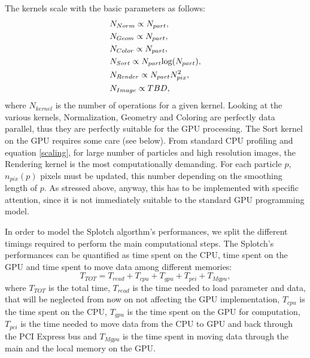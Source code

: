\documentclass[11pt]{article}
\begin{document}
The kernels scale with the basic parameters as follows:
\begin{align}\label{scaling}
& N_{Norm} \propto N_{part},\\
& N_{Geom} \propto N_{part},\\
& N_{Color} \propto N_{part},\\
& N_{Sort} \propto N_{part}{\rm log}(N_{part}),\\
& N_{Render} \propto N_{part}N_{pix}^2,\\
& N_{Image} \propto TBD,
\end{align}
where $N_{kernel}$ is the number of operations for a given kernel.
Looking at the various kernels, Normalization, Geometry and Coloring are perfectly 
data parallel, thus they are perfectly suitable for the GPU processing. 
The Sort kernel on the GPU requires some care (see below). From standard CPU profiling
and equation \eqref{scaling}, for large number of particles and high resolution images,
the Rendering kernel is the most computationally demanding. For each particle $p$,
$n_{pix}(p)$ pixels must be updated, this number depending on the smoothing length 
of $p$. As stressed above, anyway, this has to be implemented with specific attention,
since it is not immediately suitable to the standard GPU programming model.

In order to model the Splotch algorthm's performances, we split the different timings
required to perform the main computational steps. 
The Splotch's performances can be quantified as time spent on the CPU, time spent on the GPU
and time spent to move data among different memories:
\begin{equation}\label{Ts}
T_{TOT} = T_{read} + T_{cpu} + T_{gpu} + T_{pci} + T_{Mgpu},
\end{equation}
where $T_{TOT}$ is the total time, $T_{read}$ is the time needed to load parameter and data, that 
will be neglected from now on not affecting the GPU implementation, 
$T_{cpu}$ is the time spent on the CPU, $T_{gpu}$ is the time
spent on the GPU for computation, $T_{pci}$ is the time needed to move data from
the CPU to GPU and back through the PCI Express bus and $T_{Mgpu}$ is the time 
spent in moving data through the main and the local memory on the GPU.
\end{document}
